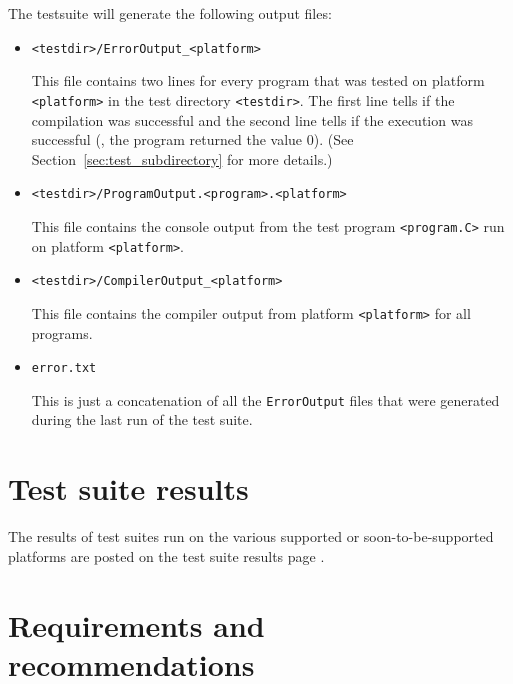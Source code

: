 The testsuite will generate the following output files:

\begin{itemize}
\item \verb|<testdir>/ErrorOutput_<platform>|

This file contains two lines for every program that was tested on
platform \texttt{<platform>} in the test directory \texttt{<testdir>}. 
The first line
tells if the compilation was successful and the second line tells if
the execution was successful (\ie, the program returned the value 0).
(See Section~\ref{sec:test_subdirectory} for more details.)

\item \verb|<testdir>/ProgramOutput.<program>.<platform>|

This file contains the console output from the test program
\texttt{<program.C>} run on platform \texttt{<platform>}.

\item \verb|<testdir>/CompilerOutput_<platform>|

This file contains the compiler output from platform 
\texttt{<platform>} for all programs.

\item \verb|error.txt|

This is just a concatenation of all the \texttt{ErrorOutput} files that were
generated during the last run of the test suite.
\end{itemize}


\section{Test suite results}
\label{sec:test_suite_results}
The results of test suites run on the various supported or soon-to-be-supported
platforms are posted on the 
%
{test suite results} 
page 
.

\section{Requirements and recommendations}
\label{sec:testing_req_and_rec}


